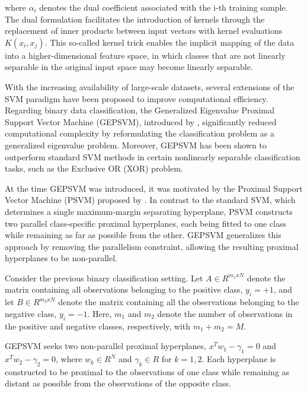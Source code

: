 \documentclass[12pt]{report} %
\begin{document}
where $\alpha_i$ denotes the dual coefficient associated with the i-th training sample. The dual formulation facilitates the introduction of kernels through the replacement of inner products between input vectors with kernel evaluations $K(x_i, x_j)$. This so-called kernel trick enables the implicit mapping of the data into a higher-dimensional feature space, in which classes that are not linearly separable in the original input space may become linearly separable.

With the increasing availability of large-scale datasets, several extensions of the SVM paradigm have been proposed to improve computational efficiency. Regarding binary data classification, the Generalized Eigenvalue Proximal Support Vector Machine (GEPSVM), introduced by \cite{mangasarian2006multisurface}, significantly reduced computational complexity by reformulating the classification problem as a generalized eigenvalue problem. Moreover, GEPSVM has been shown to outperform standard SVM methods in certain nonlinearly separable classification tasks, such as the Exclusive OR (XOR) problem.

At the time GEPSVM was introduced, it was motivated by the Proximal Support Vector Machine (PSVM) proposed by \cite{fung2001proximal}. In contrast to the standard SVM, which determines a single maximum-margin separating hyperplane, PSVM constructs two parallel class-specific proximal hyperplanes, each being fitted to one class while remaining as far as possible from the other. GEPSVM generalizes this approach by removing the parallelism constraint, allowing the resulting proximal hyperplanes to be non-parallel.

Consider the previous binary classification setting. Let $A \in R^{m_1xN}$ denote the matrix containing all observations belonging to the positive class, $y_i = +1$, and let $B \in R^{m_2xN}$ denote the matrix containing all the observations belonging to the negative class, $y_i = -1$. Here, $m_1$ and $m_2$ denote the number of observations in the positive and negative classes, respectively, with $m_1 + m_2 = M$.

\newpage

GEPSVM seeks two non-parallel proximal hyperplanes, $x^{T}w_1-\gamma_1 = 0$ and $x^{T}w_2 -\gamma_2 = 0$, where $w_k \in R^{N}$ and $\gamma_k \in R$ for $k = 1,2$. Each hyperplane is constructed to be proximal to the observations of one class while remaining as distant as possible from the observations of the opposite class.
\end{document}
